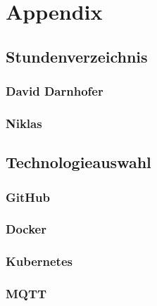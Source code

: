 
\section{Appendix}

\subsection{Stundenverzeichnis}

\subsubsection{David Darnhofer}

\subsubsection{Niklas}

\subsection{Technologieauswahl}

\subsubsection{GitHub}

\subsubsection{Docker}

\subsubsection{Kubernetes}

\subsubsection{MQTT}

